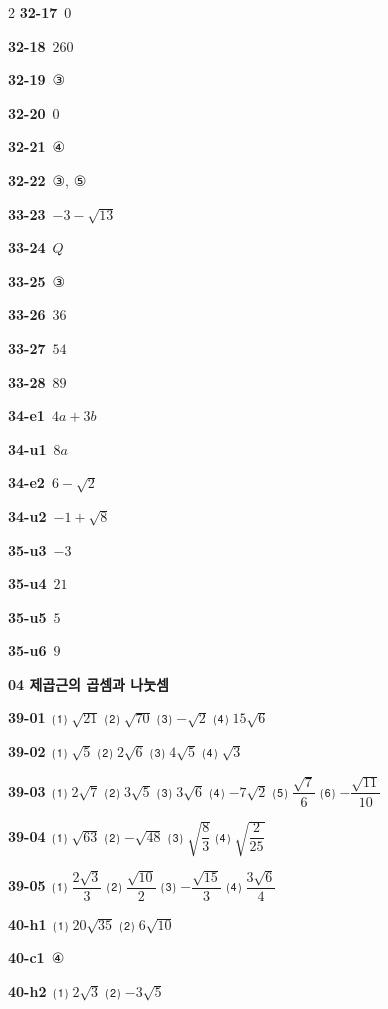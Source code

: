 \documentclass[10pt,a4paper]{article}
\begin{document}
\begin{multicols}{2}
\noindent\textbf{32-17}\ $0$\par
\noindent\textbf{32-18}\ $260$\par
\noindent\textbf{32-19}\ ③\par
\noindent\textbf{32-20}\ $0$\par
\noindent\textbf{32-21}\ ④\par
\noindent\textbf{32-22}\ ③, ⑤\par
\noindent\textbf{33-23}\ $-3-\sqrt{13}$\par
\noindent\textbf{33-24}\ $Q$\par
\noindent\textbf{33-25}\ ③\par
\noindent\textbf{33-26}\ $36$\par
\noindent\textbf{33-27}\ $54$\par
\noindent\textbf{33-28}\ $89$\par
\noindent\textbf{34-e1}\ $4a+3b$\par
\noindent\textbf{34-u1}\ $8a$\par
\noindent\textbf{34-e2}\ $6-\sqrt{2}$\par
\noindent\textbf{34-u2}\ $-1+\sqrt{8}$\par
\noindent\textbf{35-u3}\ $-3$\par
\noindent\textbf{35-u4}\ $21$\par
\noindent\textbf{35-u5}\ $5$\par
\noindent\textbf{35-u6}\ $9$\par
\noindent\textbf{04 제곱근의 곱셈과 나눗셈}\par\smallskip
\noindent\textbf{39-01}\ ⑴ $\sqrt{21}$ ⑵ $\sqrt{70}$ ⑶ $-\sqrt{2}$ ⑷ $15\sqrt{6}$\par
\noindent\textbf{39-02}\ ⑴ $\sqrt{5}$ ⑵ $2\sqrt{6}$ ⑶ $4\sqrt{5}$ ⑷ $\sqrt{3}$\par
\noindent\textbf{39-03}\ ⑴ $2\sqrt{7}$ ⑵ $3\sqrt{5}$ ⑶ $3\sqrt{6}$ ⑷ $-7\sqrt{2}$ ⑸ $\dfrac{\sqrt{7}}{6}$ ⑹ $-\dfrac{\sqrt{11}}{10}$\par
\noindent\textbf{39-04}\ ⑴ $\sqrt{63}$ ⑵ $-\sqrt{48}$ ⑶ $\sqrt{\dfrac{8}{3}}$ ⑷ $\sqrt{\dfrac{2}{25}}$\par
\noindent\textbf{39-05}\ ⑴ $\dfrac{2\sqrt{3}}{3}$ ⑵ $\dfrac{\sqrt{10}}{2}$ ⑶ $-\dfrac{\sqrt{15}}{3}$ ⑷ $\dfrac{3\sqrt{6}}{4}$\par
\noindent\textbf{40-h1}\ ⑴ $20\sqrt{35}$ ⑵ $6\sqrt{10}$\par
\noindent\textbf{40-c1}\ ④\par
\noindent\textbf{40-h2}\ ⑴ $2\sqrt{3}$ ⑵ $-3\sqrt{5}$\par

\end{multicols}
\end{document}
